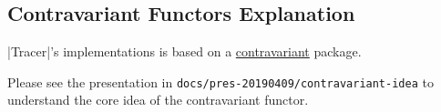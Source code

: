 

\subsection{Contravariant Functors Explanation} \label{contravariantfunctors}

|Tracer|'s implementations is based on a \href{http://hackage.haskell.org/package/contravariant}{contravariant}
package.

Please see the presentation in \texttt{docs/pres-20190409/contravariant-idea} to understand the core idea
of the contravariant functor.
